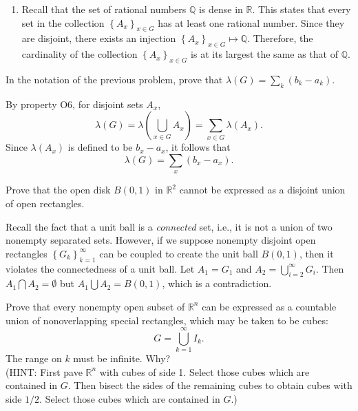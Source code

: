 \documentclass[answers]{exam}
\begin{document}
\begin{questions}
\begin{solution}
\begin{enumerate}
         \item Recall that the set of rational numbers $\mathbb{Q}$ is dense in $\mathbb{R}$. This states that every set in the collection $\left\{A_{x} \right\}_{x\in G}$ has at least one rational number. Since they are disjoint, there exists an injection $\left\{A_{x} \right\}_{x\in G} \mapsto \mathbb{Q}$. Therefore, the cardinality of the collection $\left\{A_{x} \right\}_{x\in G}$ is at its largest the same as that of $\mathbb{Q}$. 
      \end{enumerate}
   \end{solution}
   \question
   In the notation of the previous problem, prove that $\lambda\left(G\right) = \sum_{k} \left(b_{k}-a_{k}\right)$.
   \begin{solution}
      By property O6, for disjoint sets $A_{x}$,
      $$
         \lambda\left(G\right) = \lambda\left(\bigcup_{x\in G}A_{x}\right) = \sum_{x\in G}\lambda\left(A_{x}\right).
      $$
      Since $\lambda\left(A_{x}\right)$ is defined to be $b_{x} - a_{x}$, it follows that
      $$
         \lambda\left(G\right) = \sum_{x}\left(b_{x}-a_{x}\right).
      $$
   \end{solution}
   \question
   Prove that the open disk $B\left(0,1\right)$ in $\mathbb{R}^{2}$ cannot be expressed as a disjoint union of open rectangles.
   \begin{solution}
      Recall the fact that a unit ball is a \emph{connected} set, i.e., it is not a union of two nonempty separated sets. However, if we suppose nonempty disjoint open rectangles $\left\{G_{k} \right\}_{k=1}^{\infty}$ can be coupled to create the unit ball $B\left(0,1\right)$, then it violates the connectedness of a unit ball. Let $A_{1} = G_{1}$ and $A_{2} = \bigcup_{i=2}^{\infty} G_{i}$. Then $A_{1} \bigcap A_{2} = \emptyset$ but $A_{1} \bigcup A_{2} = B\left(0,1\right)$, which is a contradiction.
   \end{solution}

   \question
   Prove that every nonempty open subset of $\mathbb{R}^{n}$ can be expressed as a countable union of nonoverlapping special rectangles, which may be taken to be cubes:
   $$
      G = \bigcup_{k=1}^{\infty}I_{k}.
   $$
   The range on $k$ must be infinite. Why?\\
   (HINT: First pave $\mathbb{R}^{n}$ with cubes of side 1. Select those cubes which are contained in $G$. Then bisect the sides of the remaining cubes to obtain cubes with side $1/2$. Select those cubes which are contained in $G$.)
   \begin{solution}


\end{solution}
\end{questions}
\end{document}
